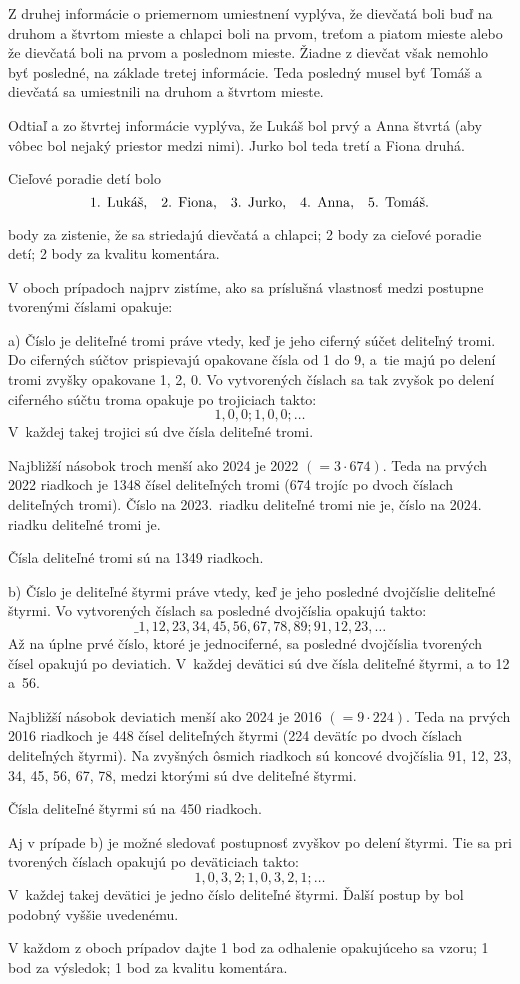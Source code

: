 {%
Z druhej informácie o priemernom umiestnení vyplýva, že dievčatá boli buď na druhom a štvrtom mieste a chlapci boli na prvom, treťom a piatom mieste alebo že dievčatá boli na prvom a poslednom mieste. Žiadne z dievčat však nemohlo byť posledné, na základe tretej informácie. Teda posledný musel byť Tomáš a dievčatá sa umiestnili na druhom a štvrtom mieste. 

Odtiaľ a zo štvrtej informácie vyplýva, že Lukáš bol prvý a Anna štvrtá (aby vôbec bol nejaký priestor medzi nimi).
Jurko bol teda tretí a Fiona druhá.

Cieľové poradie detí bolo
$$
\text{1. Lukáš,\quad 2. Fiona,\quad 3. Jurko,\quad 4. Anna,\quad 5. Tomáš.}
$$

 body za zistenie, že sa striedajú dievčatá a chlapci; 2 body za cieľové poradie
detí; 2 body za kvalitu komentára.
\endhodnotenie
}

{%
V oboch prípadoch najprv zistíme, ako sa príslušná vlastnosť medzi postupne tvorenými číslami opakuje:

\smallskip
a)
Číslo je deliteľné tromi práve vtedy, keď je jeho ciferný súčet deliteľný tromi.
Do ciferných súčtov prispievajú opakovane čísla od 1 do 9, a~tie majú po delení tromi zvyšky opakovane 1, 2, 0.
Vo vytvorených číslach sa tak zvyšok po delení ciferného súčtu troma opakuje po trojiciach takto:
$$
1, 0, 0; 1, 0, 0; \dots
$$
V~každej takej trojici sú dve čísla deliteľné tromi.


Najbližší násobok troch menší ako 2024 je 2022 $(=3\cdot674)$.
Teda na prvých 2022 riadkoch je 1348 čísel deliteľných tromi (674 trojíc po dvoch číslach deliteľných tromi).
Číslo na 2023.~riadku deliteľné tromi nie je, číslo na 2024. riadku deliteľné tromi je.

Čísla deliteľné tromi sú na 1349 riadkoch.

\smallskip
b)
Číslo je deliteľné štyrmi práve vtedy, keď je jeho posledné dvojčíslie deliteľné štyrmi.
Vo vytvorených číslach sa posledné dvojčíslia opakujú takto:
$$
\_1, 12, 23, 34, 45, 56, 67, 78, 89; 91, 12, 23, \dots
$$
Až na úplne prvé číslo, ktoré je jednociferné, sa posledné dvojčíslia tvorených čísel opakujú po deviatich.
V~každej devätici sú dve čísla deliteľné štyrmi, a to 12 a~56.

Najbližší násobok deviatich menší ako 2024 je 2016 $(=9\cdot224)$.
Teda na prvých 2016 riadkoch je 448 čísel deliteľných štyrmi (224 devätíc po dvoch číslach deliteľných štyrmi).
Na zvyšných ôsmich riadkoch sú koncové dvojčíslia 91, 12, 23, 34, 45, 56, 67, 78, medzi ktorými sú dve deliteľné štyrmi.

Čísla deliteľné štyrmi sú na 450 riadkoch.

\poznamka
Aj v prípade b) je možné sledovať postupnosť zvyškov po delení štyrmi.
Tie sa pri tvorených číslach opakujú po deväticiach takto:
$$
1, 0, 3, 2; 1, 0, 3, 2, 1; \dots
$$
V~každej takej devätici je jedno číslo deliteľné štyrmi.
Ďalší postup by bol podobný vyššie uvedenému.

\hodnotenie
V každom z oboch prípadov dajte 1 bod za odhalenie opakujúceho sa
vzoru; 1 bod za výsledok; 1 bod za kvalitu komentára.
\endhodnotenie
}

